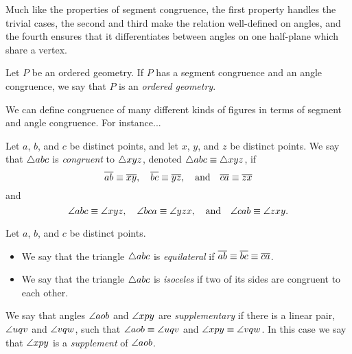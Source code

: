 Much like the properties of segment congruence, the first property handles the trivial cases, the second and third make the relation well-defined on angles, and the fourth ensures that it differentiates between angles on one half-plane which share a vertex.

\begin{dfn}
Let \(P\) be an ordered geometry. If \(P\) has a segment congruence and an angle congruence, we say that \(P\) is an \emph{ordered geometry}.
\end{dfn}

We can define congruence of many different kinds of figures in terms of segment and angle congruence. For instance...

\begin{dfn}
Let \(a\), \(b\), and \(c\) be distinct points, and let \(x\), \(y\), and \(z\) be distinct points. We say that \(\bigtriangleup{abc}\) is \emph{congruent} to \(\bigtriangleup{xyz}\), denoted \(\bigtriangleup{abc} \equiv \bigtriangleup{xyz}\), if \[ \overline{ab} \equiv \overline{xy}, \quad \overline{bc} \equiv \overline{yz}, \quad \mathrm{and} \quad \overline{ca} \equiv \overline{zx} \] and \[ \angle{abc} \equiv \angle{xyz}, \quad \angle{bca} \equiv \angle{yzx}, \quad \mathrm{and} \quad \angle{cab} \equiv \angle{zxy}. \]
\end{dfn}

\begin{dfn}
Let \(a\), \(b\), and \(c\) be distinct points.
\begin{itemize}
\item We say that the triangle \(\bigtriangleup{abc}\) is \emph{equilateral} if \(\overline{ab} \equiv \overline{bc} \equiv \overline{ca}\).
\item We say that the triangle \(\bigtriangleup{abc}\) is \emph{isoceles} if two of its sides are congruent to each other.
\end{itemize}
\end{dfn}


\begin{dfn}
We say that angles \(\angle{aob}\) and \(\angle{xpy}\) are \emph{supplementary} if there is a linear pair, \(\angle{uqv}\) and \(\angle{vqw}\), such that \(\angle{aob} \equiv \angle{uqv}\) and \(\angle{xpy} \equiv \angle{vqw}\). In this case we say that \(\angle{xpy}\) is a \emph{supplement} of \(\angle{aob}\).
\end{dfn}

